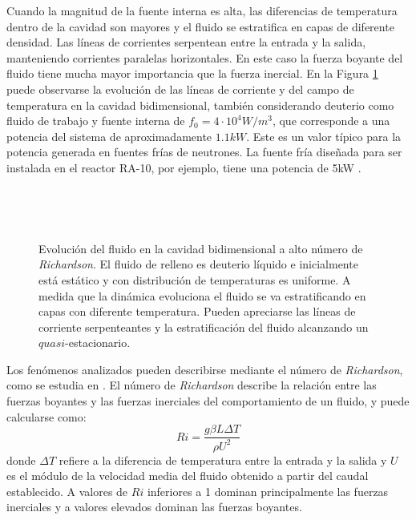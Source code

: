 Cuando la magnitud de la fuente interna es alta, las diferencias de temperatura dentro de la cavidad son mayores y el fluido se estratifica en capas de diferente densidad.
Las líneas de corrientes serpentean entre la entrada y la salida, manteniendo corrientes paralelas horizontales.
En este caso la fuerza boyante del fluido tiene mucha mayor importancia que la fuerza inercial.
En la Figura \ref{evol-1kw} puede observarse la evolución de las líneas de corriente y del campo de temperatura en la cavidad bidimensional,
también considerando deuterio como fluido de trabajo y fuente interna de $f_0=4\cdot10^4W/m^3$,
que corresponde a una potencia del sistema de aproximadamente $1.1kW$.
Este es un valor típico para la potencia generada en fuentes frías de neutrones.
La fuente fría diseñada para ser instalada en el reactor RA-10, por ejemplo, tiene una potencia de 5kW \cite{ra10}.

\begin{figure}[ht]
\begin{minipage}{.5\linewidth}
\centering
{}\\
\end{minipage}\hfill
\begin{minipage}{.5\linewidth}
\centering
{}\\
\end{minipage}
\caption[Evolución del fluido en la cavidad bidimensional a bajo Richardson]
{Evolución del fluido en la cavidad bidimensional a alto número de \textit{Richardson}.
 El fluido de relleno es deuterio líquido e inicialmente está estático y con distribución de temperaturas es uniforme.
 A medida que la dinámica evoluciona el fluido se va estratificando en capas con diferente temperatura.
 Pueden apreciarse las líneas de corriente serpenteantes y la estratificación del fluido alcanzando un $quasi$-estacionario.}
\label{evol-1kw}
\end{figure}

Los fenómenos analizados pueden describirse mediante el número de \textit{Richardson},
como se estudia en \cite{richardson}.
El número de \textit{Richardson} describe la relación entre las fuerzas boyantes y las fuerzas inerciales del comportamiento de un fluido, y puede calcularse como:
\begin{equation}
Ri = \frac{g \beta L \Delta T}{\rho U^2}
\end{equation}
donde $\Delta T$ refiere a la diferencia de temperatura entre la entrada y la salida y $U$ es el módulo de la velocidad media del fluido obtenido a partir del caudal establecido.
A valores de $Ri$ inferiores a 1 dominan principalmente las fuerzas inerciales y a valores elevados dominan las fuerzas boyantes.

